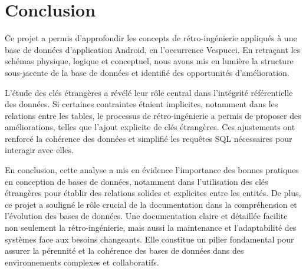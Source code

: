 \section{Conclusion}
Ce projet a permis d'approfondir les concepts de rétro-ingénierie appliqués à une base de données d'application Android, en l'occurrence Vespucci. En retraçant les schémas physique, logique et conceptuel, nous avons mis en lumière la structure sous-jacente de la base de données et identifié des opportunités d'amélioration.

L'étude des clés étrangères a révélé leur rôle central dans l'intégrité référentielle des données. Si certaines contraintes étaient implicites, notamment dans les relations entre les tables, le processus de rétro-ingénierie a permis de proposer des améliorations, telles que l'ajout explicite de clés étrangères. Ces ajustements ont renforcé la cohérence des données et simplifié les requêtes SQL nécessaires pour interagir avec elles.

En conclusion, cette analyse a mis en évidence l'importance des bonnes pratiques en conception de bases de données, notamment dans l'utilisation des clés étrangères pour établir des relations solides et explicites entre les entités. De plus, ce projet a souligné le rôle crucial de la documentation dans la compréhension et l'évolution des bases de données. Une documentation claire et détaillée facilite non seulement la rétro-ingénierie, mais aussi la maintenance et l'adaptabilité des systèmes face aux besoins changeants. Elle constitue un pilier fondamental pour assurer la pérennité et la cohérence des bases de données dans des environnements complexes et collaboratifs.